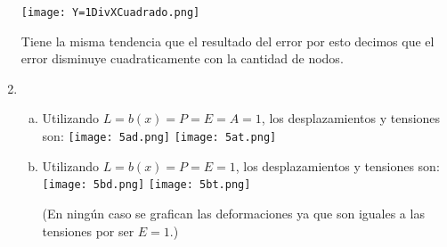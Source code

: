 \documentclass{article}
\begin{document}
\begin{enumerate}[1)]
{\begin{enumerate}[I.]
        \begin{center}
            \texttt{[image: Y=1DivXCuadrado.png]}
        \end{center}

        Tiene la misma tendencia que el resultado del error por esto decimos que el error disminuye cuadraticamente con la cantidad de nodos.
        \end{enumerate}
    }
    \item{ %
        \begin{enumerate}[a)]
        \item{
            Utilizando $L = b(x) = P = E = A = 1$, los desplazamientos y tensiones son:
            \texttt{[image: 5ad.png]}
            \texttt{[image: 5at.png]}
        }
        \item{
            Utilizando $L = b(x) = P = E = 1$, los desplazamientos y tensiones son:
            \texttt{[image: 5bd.png]}
            \texttt{[image: 5bt.png]}

            (En ningún caso se grafican las deformaciones ya que son iguales a las tensiones
            por ser $E=1$.)
        }
        \end{enumerate}
    }
\end{enumerate}
\end{document}
